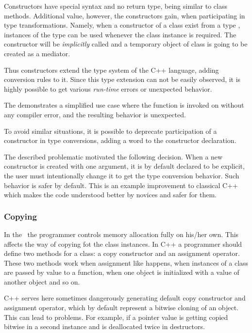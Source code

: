 Constructors have special syntax and no return type, being similar to class methods. Additional 
value, however, the constructors gain, when participating in type transformations. Namely, when
a constructor of a class  exist from a type , instances of the type  can be used whenever
the  class instance is required. The constructor will be \emph{implicitly} called and a temporary object
of class  is going to be created as a mediator. 

Thus constructors extend the type system of the C++ language, adding conversion rules to it. 
Since this type extension can not be easily observed, it is highly possible to get various 
\emph{run-time} errors or unexpected behavior. 


The  demonstrates a simplified use case where the function  is invoked on  without 
any compiler error, and the resulting behavior is unexpected.

To avoid similar situations, it is possible to deprecate participation 
of a constructor in type conversions, adding a word  to the constructor
declaration.

The described problematic motivated the following decision. When a new constructor is created with one argument, 
it is by default declared to be explicit, the user must intentionally change it to get the type conversion 
behavior. Such behavior is safer by default. This is an example improvement to classical C++ which makes
the code understood better by novices and safer for them.

\subsubsection{Copying}
\label{classcopying}

In the \cpppl\ the programmer controls memory allocation fully on his/her own. This affects the way of copying fot the class
instances.
In C++ a programmer should define two methods for a class: a copy constructor and an assignment operator.
These two methods work when assignment like  happens, when instances of a class are passed by value to a function, 
when one object is initialized with a value of another object and so on.

C++ serves here sometimes dangerously generating default copy constructor and assignment operator, which by default represent
a bitwise cloning of an object. This can lead to problems. For example, if a pointer value is getting copied bitwise in a second
instance and is deallocated twice in destructors.

